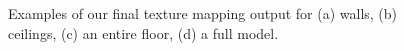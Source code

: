 \documentclass[10pt,twocolumn,letterpaper]{article}
\begin{document}
\begin{figure}
  \centering
  ~~~~~~
  \centering

  \centering
  ~~~~~~~~
  \centering {}
  \caption{Examples of our final texture mapping output for (a) walls,
    (b) ceilings, (c) an entire floor, (d) a full model.}
  \label{fig:results}
\end{figure}

{\small   }
\end{document}
